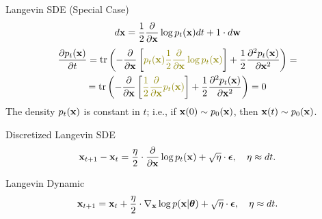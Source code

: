 \documentclass{beamer}
\begin{document}
\begin{frame}{Langevin SDE (Special Case)}
	\[
		d \mathbf{x} = \frac{1}{2} \frac{\partial}{\partial \mathbf{x}} \log p_t(\mathbf{x}) d t + 1 \cdot d \mathbf{w}
	\]
	\begin{multline*}
		\frac{\partial p_t(\bx)}{\partial t} =  \tr \left(- \frac{\partial}{\partial \bx}\left[ {\color{olive}p_t(\bx) \frac{1}{2} \frac{\partial}{\partial \bx} \log p_t(\bx)} \right]  + \frac{1}{2} \frac{\partial^2 p_t(\bx)}{\partial \bx^2} \right) = \\
		= \tr \left(- \frac{\partial}{\partial \bx}\left[ {\color{olive}\frac{1}{2} \frac{\partial}{\partial \bx} p_t(\bx) } \right]  + \frac{1}{2} \frac{\partial^2 p_t(\bx)}{\partial \bx^2} \right) = 0
	\end{multline*}
	The density $p_t(\mathbf{x})$ is constant in $t$; i.e., if $\mathbf{x}(0) \sim p_0(\mathbf{x})$, then $\mathbf{x}(t) \sim p_0(\mathbf{x})$.
	\begin{block}{Discretized Langevin SDE}
		\vspace{-0.3cm}
		\[
			\mathbf{x}_{t + 1} - \mathbf{x}_t = \frac{\eta}{2} \cdot \frac{\partial}{\partial \mathbf{x}} \log p_t(\mathbf{x}) + \sqrt{\eta} \cdot \boldsymbol{\epsilon}, \quad \eta \approx dt.
		\]
		\vspace{-0.4cm}
	\end{block}
	\begin{block}{Langevin Dynamic}
		\vspace{-0.3cm}
		\[
			\mathbf{x}_{t + 1} = \mathbf{x}_t + \frac{\eta}{2} \cdot \nabla_{\mathbf{x}} \log p(\mathbf{x} | \boldsymbol{\theta}) + \sqrt{\eta} \cdot \boldsymbol{\epsilon}, \quad \eta \approx dt.
		\]
		\vspace{-0.3cm}
	\end{block}
\end{frame}
\end{document}
